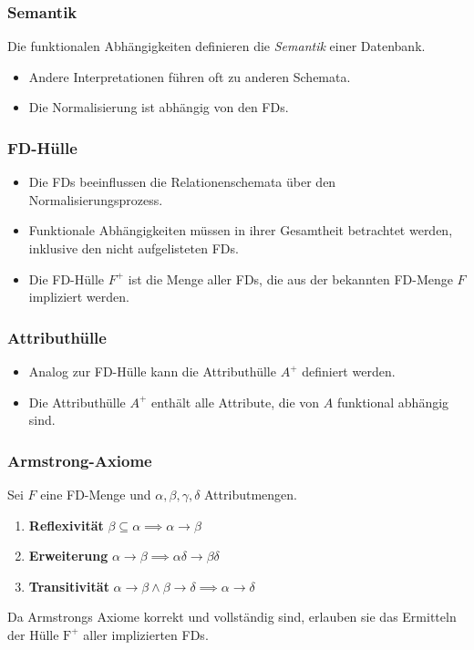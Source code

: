 	\subsubsection{Semantik} %
		Die funktionalen Abhängigkeiten definieren die \textit{Semantik} einer Datenbank.
		\begin{itemize}
			\item Andere Interpretationen führen oft zu anderen Schemata.
			\item Die Normalisierung ist abhängig von den FDs.
		\end{itemize}

	\subsubsection{FD-Hülle} %
		\begin{itemize}
			\item Die FDs beeinflussen die Relationenschemata über den Normalisierungsprozess.
			\item Funktionale Abhängigkeiten müssen in ihrer Gesamtheit betrachtet werden, inklusive den nicht aufgelisteten FDs.
			\item Die FD-Hülle \(F^+\) ist die Menge aller FDs, die aus der bekannten FD-Menge \(F\) impliziert werden.
		\end{itemize}

	\subsubsection{Attributhülle} %
		\begin{itemize}
			\item Analog zur FD-Hülle kann die Attributhülle \(A^+\) definiert werden.
			\item Die Attributhülle \(A^+\) enthält alle Attribute, die von \(A\) funktional abhängig sind.
		\end{itemize}

	\subsubsection{Armstrong-Axiome} %
		Sei \( F \) eine FD-Menge und \( \alpha, \beta, \gamma, \delta \) Attributmengen.
		\begin{enumerate}
			\item \textbf{Reflexivität} \( \beta \subseteq \alpha \implies \alpha \rightarrow \beta \)
			\item \textbf{Erweiterung} \( \alpha \rightarrow \beta \implies \alpha\delta \rightarrow \beta\delta \)
			\item \textbf{Transitivität} \( \alpha \rightarrow \beta \land \beta \rightarrow \delta \implies \alpha \rightarrow \delta \)
		\end{enumerate}
		Da Armstrongs Axiome korrekt und vollständig sind, erlauben sie das Ermitteln der Hülle \(\text{F}^+\) aller implizierten FDs.

